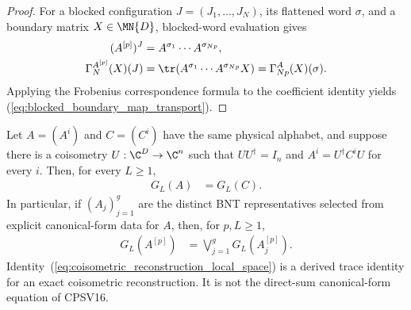 \begin{proof}
    \leanok
    For a blocked configuration $J=(J_1,\ldots,J_N)$, its flattened word
    $\sigma$, and a boundary matrix $X\in\MN{D}$, blocked-word evaluation gives
    \begin{align}
        (A^{[p]})^{J}
         & =A^{\sigma_1}\cdots A^{\sigma_{Np}},
        \label{eq:blocked_word_flattening}                        \\
        \Gamma_N^{A^{[p]}}(X)(J)
         & =\tr\!\left(A^{\sigma_1}\cdots A^{\sigma_{Np}}X\right)
        =\Gamma_{Np}^{A}(X)(\sigma).
        \label{eq:blocked_boundary_map_transport_coefficients}
    \end{align}
    Applying the Frobenius correspondence formula to the coefficient identity yields
    (\ref{eq:blocked_boundary_map_transport}).
\end{proof}

\begin{lemma}
    \label{lem:coisometric_reconstruction_local_space}
    \leanok
    Let $A=(A^i)$ and $C=(C^i)$ have the same physical alphabet, and suppose
    there is a coisometry $U:\C^D\to\C^n$ such that
    $UU^\dagger=I_n$ and $A^i=U^\dagger C^iU$ for every $i$. Then, for every
    $L\geq1$,
    \begin{align}
        G_L(A) & =G_L(C).
        \label{eq:coisometric_reconstruction_local_space}
    \end{align}
    In particular, if $(A_j)_{j=1}^g$ are the distinct BNT representatives
    selected from explicit canonical-form data for $A$, then, for $p,L\geq1$,
    \begin{align}
        G_L\!\left(A^{[p]}\right)
         & =\bigvee_{j=1}^{g}G_L\!\left(A_j^{[p]}\right).
        \label{eq:cpsv_blocked_representative_local_space}
    \end{align}
    Identity~(\ref{eq:coisometric_reconstruction_local_space}) is a derived trace identity for an exact coisometric
    reconstruction. It is not the direct-sum canonical-form equation
    of CPSV16.
\end{lemma}

